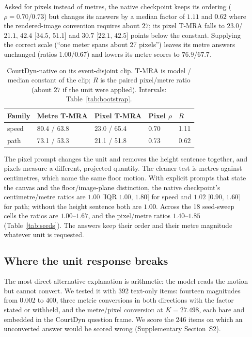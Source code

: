 \documentclass[preprint,number]{elsarticle}
\newcommand{\supp}[1]{Supplementary Section~S#1}
\begin{document}
Asked for pixels instead of metres, the native checkpoint keeps its ordering
($\rho=0.70$/$0.73$) but changes its answers by a median factor of $1.11$ and
$0.62$ where the rendered-image convention requires about $27$; its pixel
T-MRA falls to $23.0$/$21.1$, $42.4$ [$34.5$, $51.1$] and $30.7$ [$22.1$, $42.5$]
points below the constant. Supplying the correct scale (``one meter spans
about 27 pixels'') leaves its metre answers unchanged (ratios
$1.00$/$0.67$) and lowers its metre scores to $76.9$/$67.7$.

\begin{table}[t]
\centering\small
\setlength{\tabcolsep}{4pt}
\caption{CourtDyn-native on its event-disjoint clip. T-MRA is model /
  median constant of the clip; $R$ is the paired pixel/metre ratio
  (about $27$ if the unit were applied). Intervals: Table~\ref{tab:bootstrap}.}
\label{tab:nativecore}
\begin{tabular}{lllll}
\toprule
Family & Metre T-MRA & Pixel T-MRA & Pixel $\rho$ & $R$ \\
\midrule
speed & 80.4 / 63.8 & 23.0 / 65.4 & 0.70 & 1.11 \\
path  & 73.1 / 53.3 & 21.1 / 51.8 & 0.73 & 0.62 \\
\bottomrule
\end{tabular}
\end{table}



The pixel prompt changes the unit and removes the height sentence together,
and pixels measure a different, projected quantity. The cleaner test is
metres against centimetres, which name the same floor motion. With explicit
prompts that state the canvas and the floor/image-plane distinction, the native
checkpoint's centimetre/metre ratios are $1.00$ [IQR $1.00$, $1.80$] for speed
and $1.02$ [$0.90$, $1.60$] for path; without the height sentence both are
$1.00$. Across the 18 seed-sweep cells the ratios are $1.00$--$1.67$, and the
pixel/metre ratios $1.40$--$1.85$ (Table~\ref{tab:seeds}). The answers keep
their order and their metre magnitude whatever unit is requested.



\subsection{Where the unit response breaks}
\label{sec:locate}

The most direct alternative explanation is arithmetic: the model reads the
motion but cannot convert. We tested it with 392 text-only items: fourteen
magnitudes from $0.002$ to $400$, three metric conversions in both directions
with the factor stated or withheld, and the metre/pixel conversion at
$K=27.498$, each bare and embedded in the CourtDyn question frame. We score the
246 items on which an unconverted answer would be scored wrong (\supp{2}).
\end{document}
